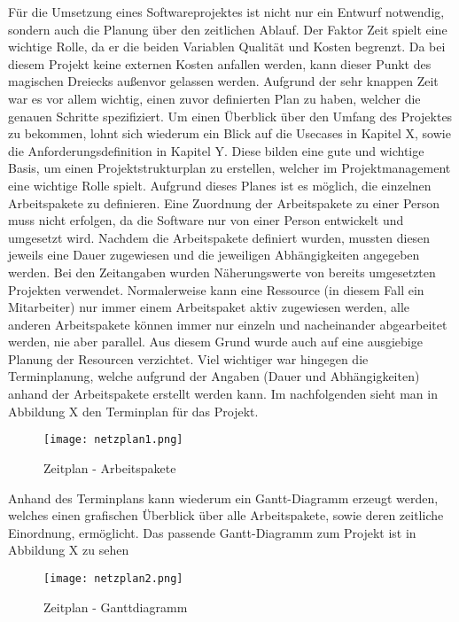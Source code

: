 Für die Umsetzung eines Softwareprojektes ist nicht nur ein Entwurf notwendig, sondern auch die Planung über den zeitlichen Ablauf. Der Faktor Zeit spielt eine wichtige Rolle, da er die beiden Variablen Qualität und Kosten begrenzt. Da bei diesem Projekt keine externen Kosten anfallen werden, kann dieser Punkt des magischen Dreiecks außenvor gelassen werden.
Aufgrund der sehr knappen Zeit war es vor allem wichtig, einen zuvor definierten Plan zu haben, welcher die genauen Schritte spezifiziert. Um einen Überblick über den Umfang des Projektes zu bekommen, lohnt sich wiederum ein Blick auf die Usecases in Kapitel X, sowie die Anforderungsdefinition in Kapitel Y. Diese bilden eine gute und wichtige Basis, um einen Projektstrukturplan zu erstellen, welcher im Projektmanagement eine wichtige Rolle spielt. Aufgrund dieses Planes ist es möglich, die einzelnen Arbeitspakete zu definieren. Eine Zuordnung der Arbeitspakete zu einer Person muss nicht erfolgen, da die Software nur von einer Person entwickelt und umgesetzt wird. Nachdem die Arbeitspakete definiert wurden, mussten diesen jeweils eine Dauer zugewiesen und die jeweiligen Abhängigkeiten angegeben werden.
Bei den Zeitangaben wurden Näherungswerte von bereits umgesetzten Projekten verwendet.
Normalerweise kann eine Ressource (in diesem Fall ein Mitarbeiter) nur immer einem Arbeitspaket aktiv zugewiesen werden, alle anderen Arbeitspakete können immer nur einzeln und nacheinander abgearbeitet werden, nie aber parallel. Aus diesem Grund wurde auch auf eine ausgiebige Planung der Resourcen verzichtet. Viel wichtiger war hingegen die Terminplanung, welche aufgrund der Angaben (Dauer und Abhängigkeiten) anhand der Arbeitspakete erstellt werden kann.
Im nachfolgenden sieht man in Abbildung X den Terminplan für das Projekt.

\begin{figure}[H]
\centering
\texttt{[image: netzplan1.png]}
\caption{Zeitplan - Arbeitspakete}
\label{fig:benchsnmpbulk}
\end{figure}

Anhand des Terminplans kann wiederum ein Gantt-Diagramm erzeugt werden, welches einen grafischen Überblick über alle Arbeitspakete, sowie deren zeitliche Einordnung, ermöglicht. Das passende Gantt-Diagramm zum Projekt ist in Abbildung X zu sehen

\begin{figure}[H]
\centering
\texttt{[image: netzplan2.png]}
\caption{Zeitplan - Ganttdiagramm}
\label{fig:benchsnmpbulk}
\end{figure}

